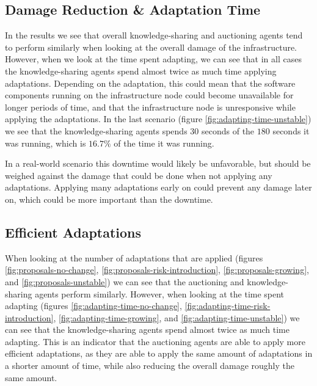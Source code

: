 \subsection{Damage Reduction \& Adaptation Time}
\label{ssec:damage-reduction}
In the results we see that overall knowledge-sharing and auctioning agents tend to perform similarly when looking at the overall damage of the infrastructure. However, when we look at the time spent adapting, we can see that in all cases the knowledge-sharing agents spend almost twice as much time applying adaptations.
Depending on the adaptation, this could mean that the software components running on the infrastructure node could become unavailable for longer periods of time, and that the infrastructure node is unresponsive while applying the adaptations.  In the last scenario (figure \ref{fig:adapting-time-unstable}) we see that the knowledge-sharing agents spends $30$ seconds of the $180$ seconds it was running, which is $16.7\%$ of the time it was running. 

In a real-world scenario this downtime would likely be unfavorable, but should be weighed against the damage that could be done when not applying any adaptations. Applying many adaptations early on could prevent any damage later on, which could be more important than the downtime.


\subsection{Efficient Adaptations}
\label{ssec:efficient-adaptations}
When looking at the number of adaptations that are applied (figures \ref{fig:proposals-no-change}, \ref{fig:proposals-risk-introduction}, \ref{fig:proposals-growing}, and \ref{fig:proposals-unstable}) we can see that the auctioning and knowledge-sharing agents perform similarly. However, when looking at the time spent adapting (figures \ref{fig:adapting-time-no-change}, \ref{fig:adapting-time-risk-introduction}, \ref{fig:adapting-time-growing}, and \ref{fig:adapting-time-unstable}) we can see that the knowledge-sharing agents spend almost twice as much time adapting. This is an indicator that the auctioning agents are able to apply more efficient adaptations, as they are able to apply the same amount of adaptations in a shorter amount of time, while also reducing the overall damage roughly the same amount.

